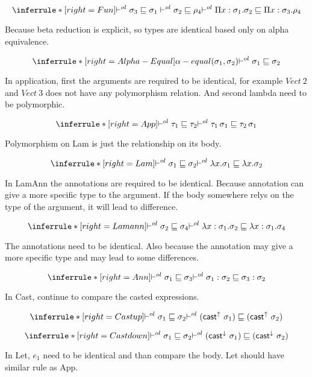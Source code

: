 \[
\inferrule*[right=Fun]
{\olpolymorphic  {\sigma_3} {\sigma_1} \\
\olpolymorphic  {\sigma_2} {\rho_4}}
{ \olpolymorphic {\Pi x:\sigma_1. \sigma_2} {\Pi x:\sigma_3. \rho_4}}
\]

Because beta reduction is explicit, so types are identical based only on alpha equivalence.

\[
\inferrule*[right=Alpha-Equal]
{  \alpha-equal(\sigma_1, \sigma_2)  }
{ \olpolymorphic {\sigma_1} {\sigma_2}}
\]

In application, first the arguments are required to be identical, for example $Vect\ 2$ and $Vect\ 3$ does not have any polymorphism relation. And second lambda need to be polymorphic.

\[
\inferrule*[right=App]
{
\olpolymorphic {\tau_1} {\tau_2}
}
{\olpolymorphic {\tau_1\, \sigma_1} {\tau_2\, \sigma_1} \\
}
\]

Polymorphism on Lam is just the relationship on its body.

\[
\inferrule*[right=Lam]
{
\olpolymorphic {\sigma_1} {\sigma_2}}
{\olpolymorphic {\lambda x. \sigma_1} {\lambda x. \sigma_2 }}
\]

In LamAnn the annotations are required to be identical. Because annotation can give a more specific type to the argument. If the body somewhere relys on the type of the argument, it will lead to difference.

\[
\inferrule*[right=Lamann]
{
\olpolymorphic {\sigma_2}{\sigma_4}}
{\olpolymorphic {\lambda x:\sigma_1. \sigma_2} {\lambda x:\sigma_1. \sigma_4}
}
\]

The annotations need to be identical. Also because the annotation may give a more specific type and may lead to some differences.

\[
\inferrule*[right=Ann]
{
\olpolymorphic {\sigma_1} {\sigma_3 }}
{\olpolymorphic {\sigma_1:\sigma_2} {\sigma_3:\sigma_2 }}
\]

In Cast, continue to compare the casted expressions.

\[
\inferrule*[right=Castup]
{
\olpolymorphic {\sigma_1} {\sigma_2}}
{\olpolymorphic {(\castupe \sigma_1)} {(\castupe \sigma_2) }}
\]

\[
\inferrule*[right=Castdown]
{
 \olpolymorphic {\sigma_1} {\sigma_2}}
 { \olpolymorphic {(\castdowne \sigma_1)} {(\castdowne \sigma_2)}}
\]

In Let, $e_1$ need to be identical and than compare the body. Let should have similar rule as App.

